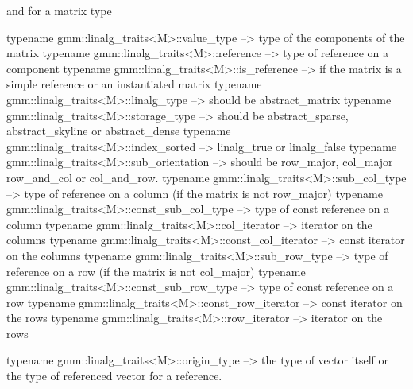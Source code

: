 \documentclass[11pt,a4paper]{article}
\begin{document}
and for a matrix type 
\begin{cppcode}
  typename gmm::linalg_traits<M>::value_type     --> type of the components of the
                                                     matrix
  typename gmm::linalg_traits<M>::reference      --> type of reference on a component
  typename gmm::linalg_traits<M>::is_reference   --> if the matrix is a simple
                                                     reference or an instantiated matrix
  typename gmm::linalg_traits<M>::linalg_type    --> should be abstract_matrix
  typename gmm::linalg_traits<M>::storage_type   --> should be abstract_sparse,
                                                     abstract_skyline or
                                                     abstract_dense
  typename gmm::linalg_traits<M>::index_sorted    --> linalg_true or linalg_false
  typename gmm::linalg_traits<M>::sub_orientation --> should be row_major, col_major
                                                      row_and_col or col_and_row.
  typename gmm::linalg_traits<M>::sub_col_type      --> type of reference on a column
                                                      (if the matrix is not row_major)
  typename gmm::linalg_traits<M>::const_sub_col_type --> type of const reference on a 
                                                       column
  typename gmm::linalg_traits<M>::col_iterator      --> iterator on the columns
  typename gmm::linalg_traits<M>::const_col_iterator --> const iterator on the columns
  typename gmm::linalg_traits<M>::sub_row_type      --> type of reference on a row
                                                      (if the matrix is not col_major)
  typename gmm::linalg_traits<M>::const_sub_row_type --> type of const reference on a 
                                                       row
  typename gmm::linalg_traits<M>::const_row_iterator --> const iterator on the rows
  typename gmm::linalg_traits<M>::row_iterator       --> iterator on the rows

  typename gmm::linalg_traits<M>::origin_type    --> the type of vector itself
                                                     or the type of referenced
                                                     vector for a reference.


\end{cppcode}
\end{document}
